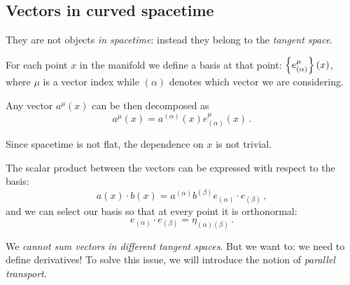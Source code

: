 \documentclass[main.tex]{subfiles}
\begin{document}
\subsection{Vectors in curved spacetime}

They are not objects \emph{in spacetime}: instead they belong to the \emph{tangent space}.

For each point \(x\) in the manifold we define a basis at that point: \(\qty{e^{\mu }_{(\alpha )}}(x)\), where \(\mu \) is a vector index while \((\alpha )\) denotes which vector we are considering.

Any vector \(a^{\mu }(x)\) can be then decomposed as  
%
\begin{equation}
  a^{\mu }(x) = a^{(\alpha) }(x) e^{\mu }_{(\alpha )}(x)
\,.
\end{equation}
%

Since spacetime is not flat, the dependence on \(x\) is not trivial.

The scalar product between the vectors can be expressed with respect to the basis: 
%
\begin{equation}
  a(x) \cdot b(x) = a^{(\alpha )} b^{(\beta )} e_{(\alpha )}\cdot e_{(\beta )}
\,,
\end{equation}
%
and we can select our basis so that at every point it is orthonormal: 
%
\begin{equation}
    e_{(\alpha )}\cdot e_{(\beta )} = \eta_{(\alpha ) (\beta )}
\,.
\end{equation}
%

We \emph{cannot sum vectors in different tangent spaces}.
But we want to: we need to define derivatives!
To solve this issue, we will introduce the notion of \emph{parallel transport}.
\end{document}
